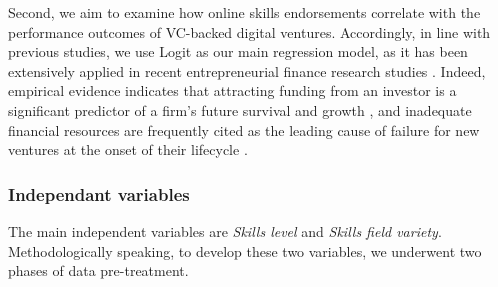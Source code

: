 \documentclass[12pt]{article}
\begin{document}
Second, we aim to examine how online skills endorsements correlate with the performance outcomes of VC-backed digital ventures. Accordingly, in line with previous studies, we use Logit as our main regression model, as it has been extensively applied in recent entrepreneurial finance research studies \citep{ahlers2015signaling, islam2018signaling}. Indeed, empirical evidence indicates that attracting funding from an investor is a significant predictor of a firm's future survival and growth \citep{beckman2007early}, and inadequate financial resources are frequently cited as the leading cause of failure for new ventures at the onset of their lifecycle \citep{franke2008venture, eddleston2016you}.

\subsubsection{Independant variables}

The main independent variables are \textit{Skills level} and \textit{Skills field variety}. Methodologically speaking, to develop these two variables, we underwent two phases of data pre-treatment.
\end{document}
